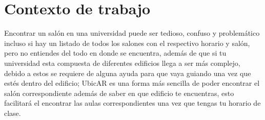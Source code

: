 \section{Contexto de trabajo}

Encontrar un salón en una universidad puede ser tedioso, confuso y problemático incluso si hay un listado de todos los salones con el respectivo horario y salón, pero no entiendes del todo en donde se encuentra, además de que si tu universidad esta compuesta de diferentes edificios llega a ser más complejo, debido a estos se requiere de alguna ayuda para que vaya guiando una vez que estés dentro del edificio; UbicAR es una forma más sencilla de poder encontrar el salón correspondiente además de saber en que edificio te encuentras, esto facilitará el encontrar las aulas correspondientes una vez que tengas tu horario de clase.